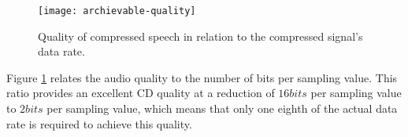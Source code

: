 \begin{figure}[h]
	\centering
		\texttt{[image: archievable-quality]}
	\caption{Quality of compressed speech in relation to the compressed signal’s data rate.}\label{fig:archievable-quality}
\end{figure}


Figure \ref{fig:archievable-quality} relates the audio quality to the number of bits per sampling value. This ratio provides an excellent CD quality at a reduction of \(16 bits\) per sampling value to \(2 bits\) per sampling value, which means that only one eighth of the actual data rate is required to achieve this quality.
\newpage\thispagestyle{empty}
